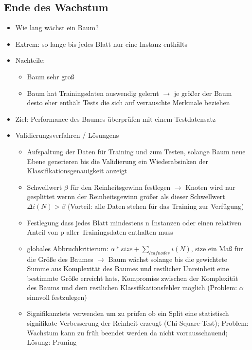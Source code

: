 \documentclass{article} %
\begin{document}
	\subsection{Ende des Wachstum}
	\begin{itemize}
		\item Wie lang wächst ein Baum?
		\item Extrem: so lange bis jedes Blatt nur eine Instanz enthälts
		\item Nachteile:
		\begin{itemize}
			\item Baum sehr groß
			\item Baum hat Trainingsdaten auswendig gelernt $\rightarrow$ je größer der Baum desto eher enthält Tests die sich auf verrauschte Merkmale beziehen
		\end{itemize}
		\item Ziel: Performance des Baumes überprüfen mit einem Testdatensatz
		\item Validierungsverfahren / Lösungens
		\begin{itemize}
			\item Aufspaltung der Daten für Training und zum Testen, solange Baum neue Ebene generieren bis die Validierung ein Wiederabsinken der Klassifikationsgenauigkeit anzeigt
			\item Schwellwert $\beta$ für den Reinheitsgewinn festlegen $\rightarrow$ Knoten wird nur gesplittet wernn der Reinheitsgewinn größer als dieser Schwellwert $\Delta i(N) > \beta$ (Vorteil: alle Daten stehen für das Training zur Verfügung)
			\item Festlegung dass jedes Blatt mindestens n Instanzen oder einen relativen Anteil von p aller Trainingsdaten enthalten muss
			\item globales Abbruchkritierum: $\alpha*size + \sum_{leaf nodes} i(N)$, size ein Maß für die Größe des Baumes $\rightarrow$ Baum wächst solange bis die gewichtete Summe aus Komplexität des Baumes und restlicher Unreinheit eine bestimmte Größe erreicht hats, Kompromiss zwischen der Komplexität des Baums und dem restlichen Klassifikationsfehler möglich (Problem: $\alpha$ sinnvoll festzulegen)
			\item Signifikanztets verwenden um zu prüfen ob ein Split eine statistisch signifikate Verbesserung der Reinheit erzeugt (Chi-Square-Test); Problem: Wachstum kann zu früh beendet werden da nicht vorrausschauend; Lösung: Pruning
		\end{itemize}
	\end{itemize}
\end{document}
